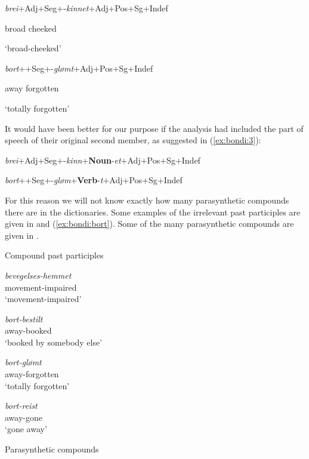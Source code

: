 \documentclass[output=paper]{LSP/langsci}
\begin{document}
\ea%
    \label{ex:2}
 
\ea
 
  \textit{brei}+Adj+Seg+-\textit{kinnet}+Adj+Pos+Sg+Indef

        broad                   cheeked

       ‘broad-cheeked’

\newpage 
\ex
 
  \textit{bort}++Seg+-\textit{glømt}+Adj+Pos+Sg+Indef

         away                   forgotten

    ‘totally forgotten’
\z
\z

It would have been better for our purpose if the analysis had included the part of speech of their original second member, as suggested in (\ref{ex:bondi:3}):

\ea%
    \label{ex:bondi:3}
 

\textit{brei}+Adj+Seg+-\textit{kinn}+\textbf{Noun}{}-\textit{et}+Adj+Pos+Sg+Indef

\textit{bort}++Seg+-\textit{gløm}+\textbf{Verb}{}-\textit{t}+Adj+Pos+Sg+Indef
\z

For this reason we will not know exactly how many parasynthetic compounds there are in the dictionaries. Some examples of the irrelevant past participles are given in  and (\ref{ex:bondi:bort}). Some of the many parasynthetic compounds are given in .

\ea%
    \label{ex:bondi:4}
 

	 Compound past participles

\ea
\textit{bevegelses-hemmet}\\
movement-impaired\\
\glt ‘movement-impaired’

\ex  \textit{bort-bestilt}\\ 
away-booked\\
\glt ‘booked by somebody else’
\z
\z

\ea \label{ex:bondi:bort}
\ea  \textit{bort-glømt}\\ 
away-forgotten\\
\glt ‘totally forgotten’

\ex   \textit{bort-reist} \\ 
away-gone\\
\glt ‘gone away’
\z
\z

\ea%
    \label{ex:bondi:5}
    
	 Parasynthetic compounds
\end{document}
